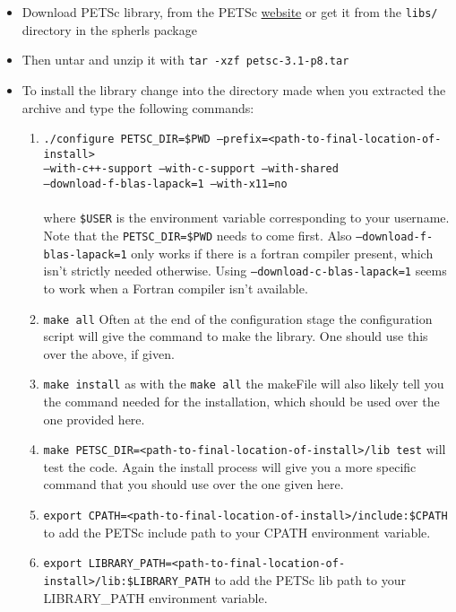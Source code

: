 \documentclass[12pt,a4paper]{book}
\begin{document}
\begin{itemize}
\item Download PETSc library, from the PETSc \href{http://www.mcs.anl.gov/petsc/download/index.html}{website} or get it from the {\tt libs/} directory in the spherls package
\item Then untar and unzip it with {\tt tar -xzf petsc-3.1-p8.tar}
\item To install the library change into the directory made when you extracted the archive and type the following commands:
\begin{enumerate}
\item {\tt ./configure PETSC\_DIR=\$PWD --prefix=<path-to-final-location-of-install> }\\{\tt --with-c++-support --with-c-support --with-shared}\\{\tt --download-f-blas-lapack=1 --with-x11=no}\\ \\ where {\tt \$USER} is the environment variable corresponding to your username.  Note that the {\tt PETSC\_DIR=\$PWD} needs to come first. Also {\tt --download-f-blas-lapack=1} only works if there is a fortran compiler present, which isn't strictly needed otherwise. Using {\tt --download-c-blas-lapack=1} seems to work when a Fortran compiler isn't available.
\item {\tt make all} Often at the end of the configuration stage the configuration script will give the command to make the library. One should use this over the above, if given.
\item {\tt make install} as with the {\tt make all} the makeFile will also likely tell you the command needed for the installation, which should be used over the one provided here.
\item {\tt make PETSC\_DIR=<path-to-final-location-of-install>/lib test} will test the code. Again the install process will give you a more specific command that you should use over the one given here.
\item {\tt export CPATH=<path-to-final-location-of-install>/include:\$CPATH} to add the PETSc include path to your CPATH environment variable.
\item {\tt export LIBRARY\_PATH=<path-to-final-location-of-install>/lib:\$LIBRARY\_PATH} to add the PETSc lib path to your LIBRARY\_PATH environment variable.
\end{enumerate}
\end{itemize}
\end{document}

